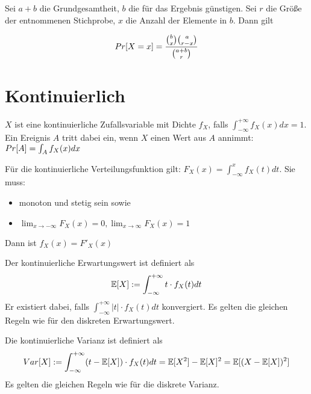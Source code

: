 \begin{definition} 
	Sei $a+b$ die Grundgesamtheit, $b$ die für das Ergebnis günstigen. Sei $r$ die Größe der entnommenen Stichprobe, $x$ die Anzahl der Elemente in $b$. Dann gilt
	
	\begin{align*}
	 Pr[X = x] =	\frac{\binom{b}{x} \binom{a}{r-x} }{\binom{a + b}{r}}
	\end{align*}
	
\end{definition}

\section{Kontinuierlich}

\begin{definition}
	$X$ ist eine kontinuierliche Zufallsvariable mit Dichte $f_X$, falls $\int_{- \infty}^{+ \infty} f_X(x) dx = 1$.
    Ein Ereignis $A$ tritt dabei ein, wenn $X$ einen Wert aus $A$ annimmt:
    $Pr[A] = \int_A f_X(x) dx$
\end{definition}

\begin{definition}
	Für die kontinuierliche Verteilungsfunktion gilt: $F_X(x) = \int_{- \infty}^x f_X(t)dt$. Sie muss:
	\begin{itemize} [noitemsep]
		\item monoton und stetig sein sowie
		\item $\lim_{x \rightarrow -\infty}F_X(x) = 0, \lim_{x \rightarrow \infty}F_X(x) = 1$
	\end{itemize}
	Dann ist $f_X(x) = F'_X(x)$
\end{definition}

\begin{definition}
	Der kontinuierliche Erwartungswert ist definiert als 
	\begin{align*}
		\mathbb{E}[X] := \int_{- \infty}^{+ \infty} t \cdot f_X(t) dt
	\end{align*}
	Er existiert dabei, falls $ \int_{- \infty}^{+ \infty} |t| \cdot f_X(t) dt$ konvergiert. Es gelten die gleichen Regeln wie für den diskreten Erwartungswert.
\end{definition}

\begin{definition}
	Die kontinuierliche Varianz ist definiert als 
	\begin{align*}
	Var[X]:= \int_{- \infty}^{+ \infty} (t - \mathbb{E}[X]) \cdot f_X(t) dt = \mathbb{E}[X^2] - \mathbb{E}[X]^2 = \mathbb{E}[(X - \mathbb{E}[X])^2]
	\end{align*}
	Es gelten die gleichen Regeln wie für die diskrete Varianz.
\end{definition}	

